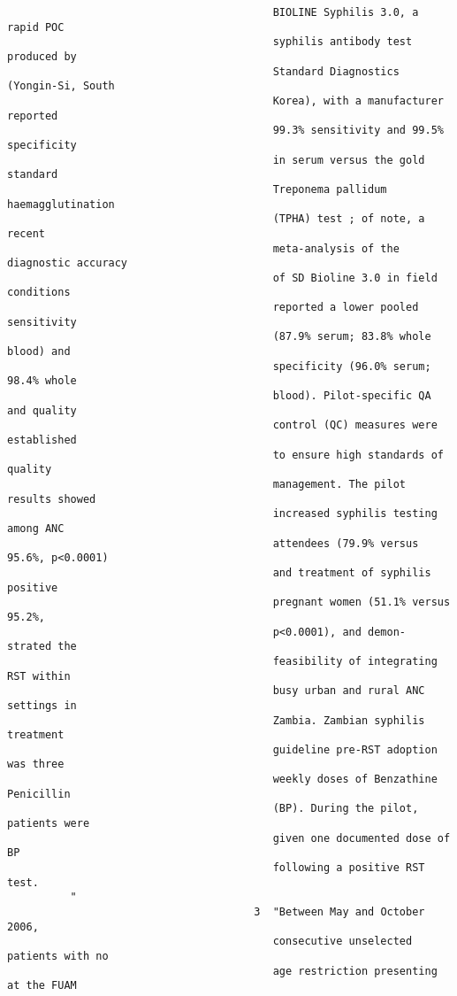 \documentclass{article}
\begin{document}
\begin{verbatim}
                                          BIOLINE Syphilis 3.0, a rapid POC
                                          syphilis antibody test produced by
                                          Standard Diagnostics (Yongin-Si, South
                                          Korea), with a manufacturer reported
                                          99.3% sensitivity and 99.5% specificity
                                          in serum versus the gold standard
                                          Treponema pallidum haemagglutination
                                          (TPHA) test ; of note, a recent
                                          meta-analysis of the diagnostic accuracy
                                          of SD Bioline 3.0 in field conditions
                                          reported a lower pooled sensitivity
                                          (87.9% serum; 83.8% whole blood) and
                                          specificity (96.0% serum; 98.4% whole
                                          blood). Pilot-specific QA and quality
                                          control (QC) measures were established
                                          to ensure high standards of quality
                                          management. The pilot results showed
                                          increased syphilis testing among ANC
                                          attendees (79.9% versus 95.6%, p<0.0001)
                                          and treatment of syphilis positive
                                          pregnant women (51.1% versus 95.2%,
                                          p<0.0001), and demon- strated the
                                          feasibility of integrating RST within
                                          busy urban and rural ANC settings in
                                          Zambia. Zambian syphilis treatment
                                          guideline pre-RST adoption was three
                                          weekly doses of Benzathine Penicillin
                                          (BP). During the pilot, patients were
                                          given one documented dose of BP
                                          following a positive RST test.
          "
                                       3  "Between May and October 2006,
                                          consecutive unselected patients with no
                                          age restriction presenting at the FUAM

\end{verbatim}
\end{document}
